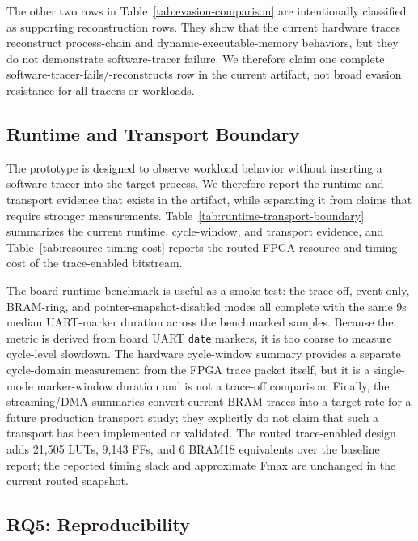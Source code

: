 The other two rows in Table~\ref{tab:evasion-comparison} are intentionally
classified as supporting reconstruction rows. They show that the current
hardware traces reconstruct process-chain and dynamic-executable-memory
behaviors, but they do not demonstrate software-tracer failure. We therefore
claim one complete software-tracer-fails/\rvmt-reconstructs row in the current
artifact, not broad evasion resistance for all tracers or workloads.

\subsection{Runtime and Transport Boundary}
\label{subsec:runtime-transport-boundary}

The prototype is designed to observe workload behavior without inserting a
software tracer into the target process. We therefore report the runtime and
transport evidence that exists in the artifact, while separating it from claims
that require stronger measurements. Table~\ref{tab:runtime-transport-boundary}
summarizes the current runtime, cycle-window, and transport evidence, and
Table~\ref{tab:resource-timing-cost} reports the routed FPGA resource and timing
cost of the trace-enabled bitstream.





The board runtime benchmark is useful as a smoke test: the trace-off,
event-only, BRAM-ring, and pointer-snapshot-disabled modes all complete with the
same 9s median UART-marker duration across the benchmarked samples. Because the
metric is derived from board UART \texttt{date} markers, it is too coarse to
measure cycle-level slowdown. The hardware cycle-window summary provides a
separate cycle-domain measurement from the FPGA trace packet itself, but it is a
single-mode marker-window duration and is not a trace-off comparison. Finally,
the streaming/DMA summaries convert current BRAM traces into a target rate for a
future production transport study; they explicitly do not claim that such a
transport has been implemented or validated. The routed trace-enabled design
adds 21,505 LUTs, 9,143 FFs, and 6 BRAM18 equivalents over the baseline report;
the reported timing slack and approximate Fmax are unchanged in the current
routed snapshot.

\subsection{RQ5: Reproducibility}
\label{subsec:rq5-reproducibility}

